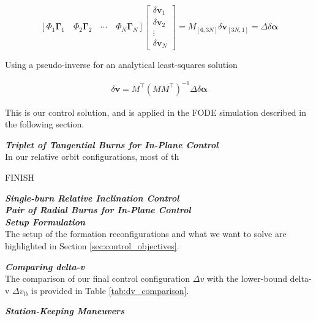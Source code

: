 \begin{equation}
\left[
\Phi_1 \mathbf{\Gamma}_1 \quad
\Phi_2 \mathbf{\Gamma}_2 \quad
\cdots \quad
\Phi_N \mathbf{\Gamma}_N
\right]
\begin{bmatrix}
\delta \mathbf{v}_1 \\
\delta \mathbf{v}_2 \\
\vdots \\
\delta \mathbf{v}_N
\end{bmatrix}
= M_{[6,3N]} \delta \mathbf{v}_{[3N,1]} = \Delta \delta \boldsymbol{\alpha}
\end{equation}

Using a pseudo-inverse for an analytical least-squares solution 

\begin{align}
    \delta \mathbf{v} = M^\top (M M^\top)^{-1} \Delta \delta \boldsymbol{\alpha}
\end{align}

This is our control solution, and is applied in the FODE simulation described in the following section.

\textit{\textbf{Triplet of Tangential Burns for In-Plane Control}}\\

In our relative orbit configurations, most of th

FINISH

\textit{\textbf{Single-burn Relative Inclination Control}}\\


\textit{\textbf{Pair of Radial Burns for In-Plane Control}}\\

\textbf{\textit{Setup Formulation}} \\
The setup of the formation reconfigurations and what we want to solve are highlighted in Section \ref{sec:control_objectives}.

\textbf{\textit{Comparing delta-v}} \\
The comparison of our final control configuration $\Delta v$ with the lower-bound delta-v $\Delta v_{lb}$ is provided in Table \ref{tab:dv_comparison}.

\textbf{\textit{Station-Keeping Maneuvers}}

